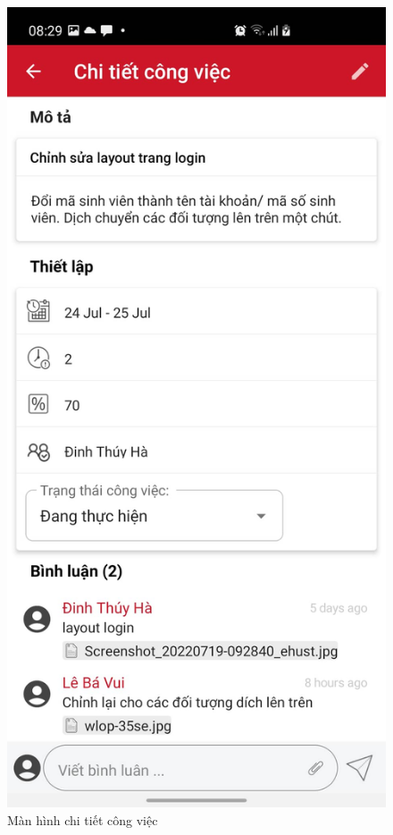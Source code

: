 \documentclass[../Main.tex]{subfiles}
\begin{document}
\begin{figure}[H]
\begin{minipage}{0.5\textwidth}
\includegraphics[width=0.7\linewidth]{Figure/screen/detail_task.jpeg}
\caption{Màn hình chi tiết công việc} \label{fig:screen_login}
\end{minipage}
\hspace{\fill}
\begin{minipage}{0.5\textwidth}

\end{minipage}
\end{figure}
\end{document}
